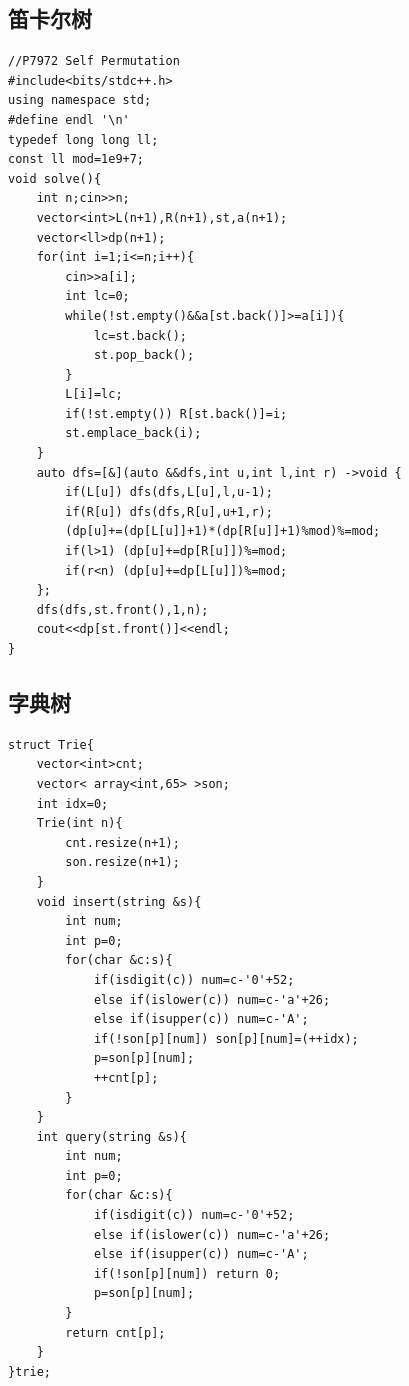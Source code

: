 \documentclass[11pt,a4paper,twocolumn]{ctexart}  %
\begin{document}
\subsection{笛卡尔树}
\begin{lstlisting}[caption={cartesian-tree},label={lst:cartesian-tree}]
//P7972 Self Permutation
#include<bits/stdc++.h>
using namespace std;
#define endl '\n'
typedef long long ll;
const ll mod=1e9+7;
void solve(){
    int n;cin>>n;
    vector<int>L(n+1),R(n+1),st,a(n+1);
    vector<ll>dp(n+1);
    for(int i=1;i<=n;i++){
        cin>>a[i];
        int lc=0;
        while(!st.empty()&&a[st.back()]>=a[i]){
            lc=st.back();
            st.pop_back();
        }
        L[i]=lc;
        if(!st.empty()) R[st.back()]=i;
        st.emplace_back(i); 
    }
    auto dfs=[&](auto &&dfs,int u,int l,int r) ->void {
        if(L[u]) dfs(dfs,L[u],l,u-1);
        if(R[u]) dfs(dfs,R[u],u+1,r);
        (dp[u]+=(dp[L[u]]+1)*(dp[R[u]]+1)%mod)%=mod;
        if(l>1) (dp[u]+=dp[R[u]])%=mod;
        if(r<n) (dp[u]+=dp[L[u]])%=mod;   
    };
    dfs(dfs,st.front(),1,n);
    cout<<dp[st.front()]<<endl;
}
\end{lstlisting}

\subsection{字典树}
\begin{lstlisting}[caption={Trie},label={lst:Trie}]
struct Trie{
    vector<int>cnt;
    vector< array<int,65> >son;
    int idx=0;
    Trie(int n){
        cnt.resize(n+1);
        son.resize(n+1);
    }
    void insert(string &s){
        int num;
        int p=0;
        for(char &c:s){
            if(isdigit(c)) num=c-'0'+52;
            else if(islower(c)) num=c-'a'+26;
            else if(isupper(c)) num=c-'A';
            if(!son[p][num]) son[p][num]=(++idx);
            p=son[p][num];
            ++cnt[p];
        }
    }
    int query(string &s){
        int num;
        int p=0;
        for(char &c:s){
            if(isdigit(c)) num=c-'0'+52;
            else if(islower(c)) num=c-'a'+26;
            else if(isupper(c)) num=c-'A';
            if(!son[p][num]) return 0;
            p=son[p][num];
        }
        return cnt[p];
    }
}trie;
\end{lstlisting}
\end{document}
